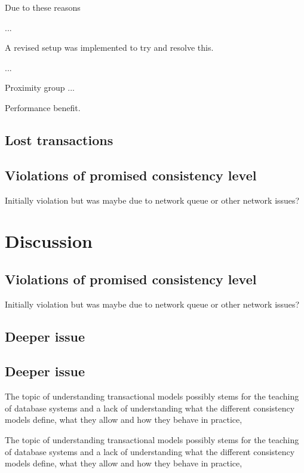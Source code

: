 \documentclass[a4paper,10pt,titlepage]{report}
\begin{document}
    Due to these reasons

    ...

    A revised setup was implemented to try and resolve this.

    ...

    Proximity group
    ...


    Performance benefit.

    \subsection{Lost transactions}

    \subsection{Violations of promised consistency level}
    Initially violation but was maybe due to network queue or other network issues?


    \section{Discussion}
\subsection{Violations of promised consistency level}

    Initially violation but was maybe due to network queue or other network issues?


    \subsection{Deeper issue}
\subsection{Deeper issue}
The topic of understanding transactional models possibly stems for the teaching of database systems and a lack of understanding what the different consistency models define, what they allow and how they behave in practice,

    The topic of understanding transactional models possibly stems for the teaching of database systems and a lack of understanding what the different consistency models define, what they allow and how they behave in practice,
\end{document}
